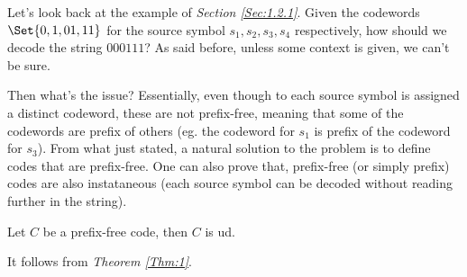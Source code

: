\documentclass{subfiles}
\begin{document}
    Let's look back at the example of \emph{Section \ref{Sec:1.2.1}}. 
    Given the codewords \(\Set{0, 1, 01, 11}\) for the source symbol \(s_{1},
    s_{2}, s_{3}, s_{4}\) respectively, how should we decode the string \(000111\)?
    As said before, unless some context is given, we can't be sure.

    Then what's the issue? 
    Essentially, even though to each source symbol is assigned a distinct codeword,
    these are not prefix-free, meaning that some of the codewords are prefix of others
    (eg. the codeword for \(s_{1}\) is prefix of the codeword for \(s_{3}\)).
    From what just stated, a natural solution to the problem is to define codes 
    that are prefix-free.
        One can also prove that, prefix-free (or simply prefix) codes are also instataneous (each 
    source symbol can be decoded without reading further in the string).
    \begin{theorem*}
        Let \(C\) be a prefix-free code, then \(C\) is \gls{ud}.
    \end{theorem*}
    \begin{proof*}
        It follows from \emph{Theorem \ref{Thm:1}}.
    \end{proof*}
\end{document}
